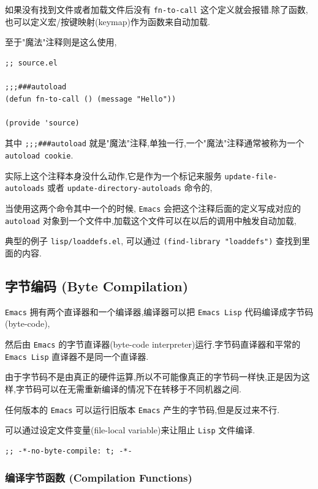 \documentclass[11pt]{article}
\begin{document}
如果没有找到文件或者加载文件后没有 \texttt{fn-to-call} 这个定义就会报错.除了函数,也可以定义宏/按键映射(keymap)作为函数来自动加载.

至于"魔法"注释则是这么使用,

\begin{verbatim}
;; source.el

;;;###autoload
(defun fn-to-call () (message "Hello"))

(provide 'source)
\end{verbatim}

其中 \texttt{;;;\#\#\#autoload} 就是"魔法"注释,单独一行,一个"魔法"注释通常被称为一个 \texttt{autoload cookie}.

实际上这个注释本身没什么动作,它是作为一个标记来服务 \texttt{update-file-autoloads} 或者 \texttt{update-directory-autoloads} 命令的,

当使用这两个命令其中一个的时候, \texttt{Emacs} 会把这个注释后面的定义写成对应的 \texttt{autoload} 对象到一个文件中,加载这个文件可以在以后的调用中触发自动加载,

典型的例子 \texttt{lisp/loaddefs.el}, 可以通过 \texttt{(find-library "loaddefs")} 查找到里面的内容.


\subsection{字节编码 (Byte Compilation)}
\label{sec:orga414471}

\texttt{Emacs} 拥有两个直译器和一个编译器,编译器可以把 \texttt{Emacs Lisp} 代码编译成字节码(byte-code),

然后由 \texttt{Emacs} 的字节直译器(byte-code interpreter)运行.字节码直译器和平常的 \texttt{Emacs Lisp} 直译器不是同一个直译器.

由于字节码不是由真正的硬件运算,所以不可能像真正的字节码一样快,正是因为这样,字节码可以在无需重新编译的情况下在转移于不同机器之间.

任何版本的 \texttt{Emacs} 可以运行旧版本 \texttt{Emacs} 产生的字节码,但是反过来不行.

可以通过设定文件变量(file-local variable)来让阻止 \texttt{Lisp} 文件编译.

\begin{verbatim}
;; -*-no-byte-compile: t; -*-
\end{verbatim}

\subsubsection{编译字节函数 (Compilation Functions)}
\label{sec:orge554397}
\end{document}
